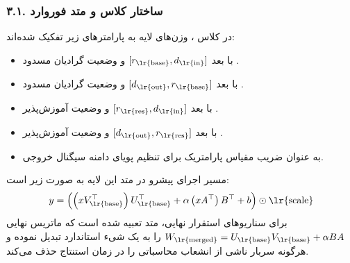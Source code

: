 \subsubsection*{۳.۱. ساختار کلاس  و متد فوروارد}
در کلاس ، وزن‌های لایه به پارامترهای زیر تفکیک شده‌اند:
\begin{itemize}
    \item {} با بعد $[r_{\text{\lr{base}}}, d_{\text{\lr{in}}}]$ و وضعیت گرادیان مسدود .
    \item {} با بعد $[d_{\text{\lr{out}}}, r_{\text{\lr{base}}}]$ و وضعیت گرادیان مسدود .
    \item {} با بعد $[r_{\text{\lr{res}}}, d_{\text{\lr{in}}}]$ و وضعیت آموزش‌پذیر .
    \item {} با بعد $[d_{\text{\lr{out}}}, r_{\text{\lr{res}}}]$ و وضعیت آموزش‌پذیر .
    \item {} به عنوان ضریب مقیاس پارامتریک برای تنظیم پویای دامنه سیگنال خروجی.
\end{itemize}
مسیر اجرای پیشرو در متد  این لایه به صورت زیر است:
\begin{equation}
y = \left( \left(x V_{\text{\lr{base}}}^\top\right) U_{\text{\lr{base}}}^\top + \alpha \left(x A^\top\right) B^\top + b \right) \odot \text{\lr{scale}}
\end{equation}
برای سناریوهای استقرار نهایی، متد  تعبیه شده است که ماتریس نهایی $W_{\text{\lr{merged}}} = U_{\text{\lr{base}}} V_{\text{\lr{base}}} + \alpha B A$ را به یک شیء استاندارد  تبدیل نموده و هرگونه سربار ناشی از انشعاب محاسباتی را در زمان استنتاج حذف می‌کند.

